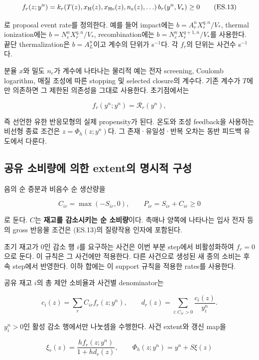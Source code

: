 \documentclass[11pt,a4paper]{article}
\begin{document}
\[
f_r(z;y^n)=k_r\!\left(T(z),x_{\rm H}(z),x_{\rm He}(z),
n_e(z),\ldots\right)b_r(y^n,V_*)
\ge0
\tag{ES.13}
\]

로 proposal event rate를 정의한다. 예를 들어 impact에는 \(b=A_r^nX_r^{q,n}/V_*\), thermal ionization에는 \(b=N_e^nX_r^{q,n}/V_*\), recombination에는 \(b=N_e^nX_r^{q+1,n}/V_*\)를 사용한다. 끝단 thermalization은 \(b=A_L^n\)이고 계수의 단위가 s\(^{-1}\)다. 각 \(f_r\)의 단위는 사건수 s\(^{-1}\)다.

분율 \(x\)와 밀도 \(n_e\)가 계수에 나타나는 물리적 예는 전자 screening, Coulomb logarithm, 매질 조성에 따른 stopping 및 selected closure의 계수다. 기존 계수가 \(T\)에만 의존하면 그 제한된 의존성을 그대로 사용한다. 초기점에서는

\[
f_r(y^n;y^n)=\mathcal R_r(y^n),
\]

즉 선언한 유한 반응모형의 실제 propensity가 된다. 온도와 조성 feedback을 사용하는 비선형 종료 조건은 \(z=\Phi_h(z;y^n)\)다. 그 존재·유일성·반복 오차는 동반 피드백 유도에서 다룬다.

\hypertarget{uxacf5uxc720-uxc18cuxbe44uxb7c9uxc5d0-uxc758uxd55c-extentuxc758-uxba85uxc2dcuxc801-uxad6cuxc131}{%
\subsection{공유 소비량에 의한 extent의 명시적 구성}\label{uxacf5uxc720-uxc18cuxbe44uxb7c9uxc5d0-uxc758uxd55c-extentuxc758-uxba85uxc2dcuxc801-uxad6cuxc131}}

음의 순 증분과 비음수 순 생산량을

\[
C_{ir}=\max(-S_{ir},0),\qquad P_{ir}=S_{ir}+C_{ir}\ge0
\]

로 둔다. \(C\)는 \textbf{재고를 감소시키는 순 소비량}이다. 촉매나 양쪽에 나타나는 입사 전자 등의 gross 반응물 조건은 (ES.13)의 질량작용 인자에 포함된다.

초기 재고가 0인 감소 행 \(i\)를 요구하는 사건은 이번 부분 step에서 비활성화하여 \(f_r=0\)으로 둔다. 이 규칙은 그 사건에만 적용한다. 다른 사건으로 생성된 새 종의 소비는 후속 step에서 반영한다. 이하 합에는 이 support 규칙을 적용한 rates를 사용한다.

공유 재고 \(i\)의 총 제안 소비율과 사건별 denominator는

\[
c_i(z)=\sum_r C_{ir}f_r(z;y^n),\qquad
d_r(z)=\sum_{i:C_{ir}>0}\frac{c_i(z)}{y_i^n}.
\tag{ES.14}
\]

\(y_i^n>0\)인 활성 감소 행에서만 나눗셈을 수행한다. 사건 extent와 갱신 map을

\[
\boxed{
\xi_r(z)=\frac{h f_r(z;y^n)}{1+h d_r(z)},\qquad
\Phi_h(z;y^n)=y^n+S\xi(z)
}
\tag{ES.15}
\]
\end{document}
